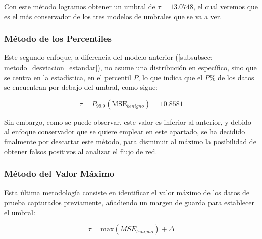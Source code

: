 \documentclass[12pt]{article}
\numberwithin{equation}{section} %
\begin{document}
    Con este método logramos obtener un umbral de $\tau = 13.0748$, el cual veremos que es el más conservador de los tres modelos de umbrales que se va a ver.

    \vspace{10mm}

    \subsubsection{Método de los Percentiles}\label{subsubsec: metodo_percentiles}

    \vspace{5mm}

    Este segundo enfoque, a diferencia del modelo anterior (\ref{subsubsec: metodo_desviacion_estandar}), no asume una distribución en específico, sino que se centra en la estadística, en el percentil $P$, lo que indica que el $P\%$ de los datos se encuentran por debajo del umbral, como sigue:

    \vspace{2.5mm}

    \begin{equation}
        \tau = P_{99.9} \left( \text{MSE}_{benigno} \right) = 10.8581
    \end{equation}

    \vspace{2.5mm}

    Sin embargo, como se puede observar, este valor es inferior al anterior, y debido al enfoque conservador que se quiere emplear en este apartado, se ha decidido finalmente por descartar este método, para disminuir al máximo la posibilidad de obtener falsos positivos al analizar el flujo de red.

    \vspace{10mm}

    \subsubsection{Método del Valor Máximo}\label{subsubsec: metodo_valor_maximo}

    \vspace{5mm}

    Esta última metodología consiste en identificar el valor máximo de los datos de prueba capturados previamente, añadiendo un margen de guarda para establecer el umbral:

    \vspace{2.5mm}

    \begin{equation}
        \tau = \text{max}\left( MSE_{benigno} \right) + \Delta
    \end{equation}
\end{document}
